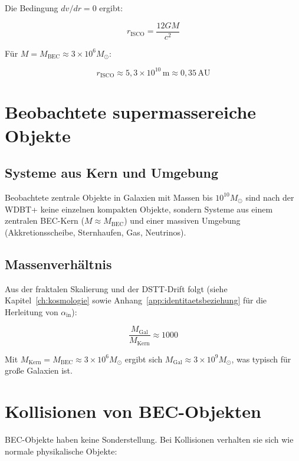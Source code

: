 Die Bedingung \( dv/dr = 0 \) ergibt:

\[
r_{\text{ISCO}} = \frac{12GM}{c^2} \tag{K.21}
\]

Für \( M = M_{\text{BEC}} \approx 3 \times 10^6 M_{\odot} \):

\[
r_{\text{ISCO}} \approx 5,3 \times 10^{10} \, \text{m} \approx 0,35 \, \text{AU}
\]

\section{Beobachtete supermassereiche Objekte}
\label{app:bec_beobachtung}

\subsection{Systeme aus Kern und Umgebung}
\label{sub:bec_systeme}

Beobachtete zentrale Objekte in Galaxien mit Massen bis \( 10^{10} M_{\odot} \) 
sind nach der WDBT+ keine einzelnen kompakten Objekte, sondern Systeme 
aus einem zentralen BEC-Kern (\( M \approx M_{\text{BEC}} \)) und einer 
massiven Umgebung (Akkretionsscheibe, Sternhaufen, Gas, Neutrinos).

\subsection{Massenverhältnis}
\label{sub:bec_massenverhaeltnis}

Aus der fraktalen Skalierung und der DSTT-Drift folgt (siehe Kapitel~\ref{ch:kosmologie} 
sowie Anhang~\ref{app:identitaetsbeziehung} für die Herleitung von \( \alpha_{\text{in}} \)):

\[
\frac{M_{\text{Gal}}}{M_{\text{Kern}}} \approx 1000 \tag{K.22}
\]

Mit \( M_{\text{Kern}} = M_{\text{BEC}} \approx 3 \times 10^6 M_{\odot} \) 
ergibt sich \( M_{\text{Gal}} \approx 3 \times 10^9 M_{\odot} \), 
was typisch für große Galaxien ist.

\section{Kollisionen von BEC-Objekten}
\label{app:bec_kollisionen}

BEC-Objekte haben keine Sonderstellung. Bei Kollisionen verhalten sie sich 
wie normale physikalische Objekte:

